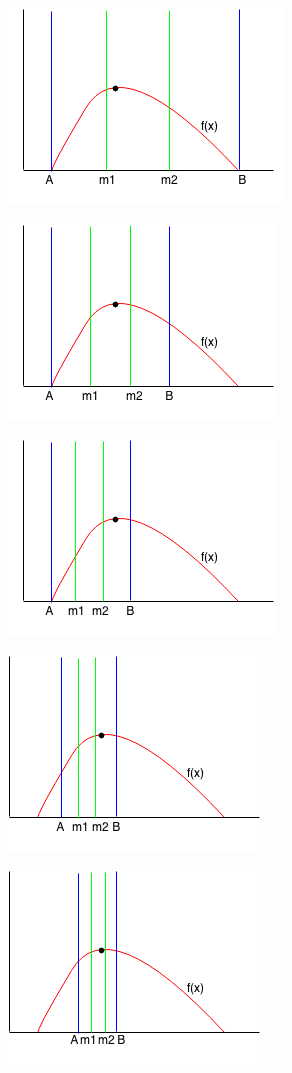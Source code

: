 \documentclass[11pt,oneside]{book}
\makeatletter
\def\maxwidth#1{\ifdim\Gin@nat@width>#1 #1\else\Gin@nat@width\fi}
\makeatother
\begin{document}
\includegraphics[width=\maxwidth{\textwidth}]{ternarysearch2.png}

\includegraphics[width=\maxwidth{\textwidth}]{ternarysearch3.png}

\includegraphics[width=\maxwidth{\textwidth}]{ternarysearch4.png}

\includegraphics[width=\maxwidth{\textwidth}]{ternarysearch5.png}

\includegraphics[width=\maxwidth{\textwidth}]{ternarysearch6.png}
\end{document}
